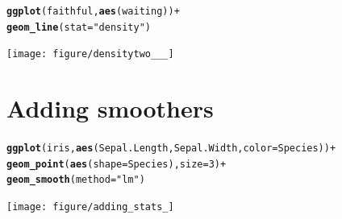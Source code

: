 \documentclass{beamer}\usepackage[]{graphicx}\usepackage[]{color}
\makeatletter
\newcommand{\hlnum}[1]{\textcolor[rgb]{0.686,0.059,0.569}{#1}}%
\newcommand{\hlstr}[1]{\textcolor[rgb]{0.192,0.494,0.8}{#1}}%
\newcommand{\hlopt}[1]{\textcolor[rgb]{0,0,0}{#1}}%
\newcommand{\hlstd}[1]{\textcolor[rgb]{0.345,0.345,0.345}{#1}}%
\newcommand{\hlkwc}[1]{\textcolor[rgb]{0.333,0.667,0.333}{#1}}%
\newcommand{\hlkwd}[1]{\textcolor[rgb]{0.737,0.353,0.396}{\textbf{#1}}}%
\newenvironment{kframe}{%
 \def\at@end@of@kframe{}%
 \ifinner\ifhmode%
  \def\at@end@of@kframe{\end{minipage}}%
  \begin{minipage}{\columnwidth}%
 \fi\fi%
 \def\FrameCommand##1{\hskip\@totalleftmargin \hskip-\fboxsep
 \colorbox{shadecolor}{##1}\hskip-\fboxsep
     \hskip-\linewidth \hskip-\@totalleftmargin \hskip\columnwidth}%
 \MakeFramed {\advance\hsize-\width
   \@totalleftmargin\z@ \linewidth\hsize
   \@setminipage}}%
 {\par\unskip\endMakeFramed%
 \at@end@of@kframe}
\newenvironment{knitrout}{}{} %
\makeatother
\begin{document}

\begin{frame}[fragile]
\begin{knitrout}\footnotesize
{}\color{fgcolor}\begin{kframe}
\begin{alltt}
\hlkwd{ggplot}\hlstd{(faithful,} \hlkwd{aes}\hlstd{(waiting))} \hlopt{+}
\hlkwd{geom_line}\hlstd{(}\hlkwc{stat} \hlstd{=} \hlstr{"density"}\hlstd{)}
\end{alltt}
\end{kframe}

{\centering \texttt{[image: figure/densitytwo\_\_\_]} 

}



\end{knitrout}
\end{frame}


\section*{Adding smoothers}
\frame{\sectionpage}


\begin{frame}[fragile]
\begin{knitrout}\footnotesize
{}\color{fgcolor}\begin{kframe}
\begin{alltt}
\hlkwd{ggplot}\hlstd{(iris,} \hlkwd{aes}\hlstd{(Sepal.Length, Sepal.Width,} \hlkwc{color} \hlstd{= Species))} \hlopt{+}
\hlkwd{geom_point}\hlstd{(}\hlkwd{aes}\hlstd{(}\hlkwc{shape} \hlstd{= Species),} \hlkwc{size} \hlstd{=} \hlnum{3}\hlstd{)} \hlopt{+}
\hlkwd{geom_smooth}\hlstd{(}\hlkwc{method} \hlstd{=} \hlstr{"lm"}\hlstd{)}
\end{alltt}
\end{kframe}

{\centering \texttt{[image: figure/adding\_stats\_]} 

}



\end{knitrout}
\end{frame}
\end{document}
